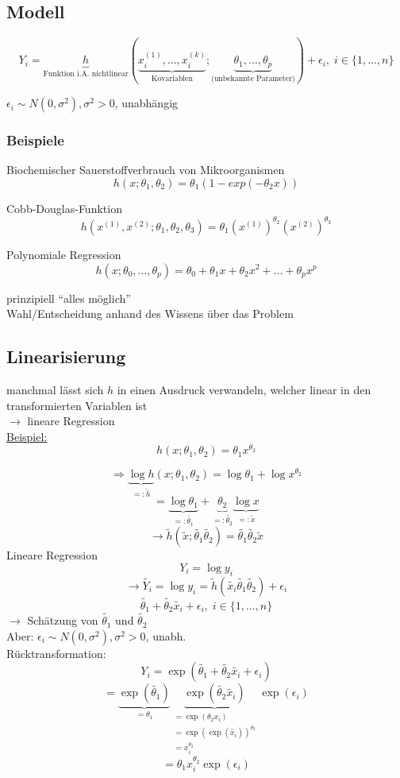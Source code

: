 \documentclass[10pt]{report}
\theoremstyle{definition}
\begin{document}
\subsection{Modell}
\[Y_i = \underbrace{h}_{\text{Funktion i.A. nichtlinear}} \left(\underbrace{x_i^{(1)},...,x_i^{(k)}}_{\text{Kovariablen}};
\underbrace{\theta_1,...,\theta_p}_{\text{(unbekannte Parameter)}} \right) + \epsilon_i, \; i \in \{1,...,n\} \]

$\epsilon_i \sim N(0,\sigma^2) , \sigma^2 >0$, unabhängig

\subsubsection{Beispiele}
Biochemischer Sauerstoffverbrauch von Mikroorganismen
\[h(x;\theta_1,\theta_2) = \theta_1(1-exp(-\theta_2 x)) \]

Cobb-Douglas-Funktion
\[h(x^{(1)},x^{(2)}; \theta_1, \theta_2, \theta_3)= \theta_1(x^{(1)})^{\theta_2} (x^{(2)})^{\theta_3} \]

Polynomiale Regression
\[h(x; \theta_0,..., \theta_p)= \theta_0 + \theta_1 x  + \theta_2 x^2 + ... + \theta_p x^p \]

prinzipiell ``alles möglich'' \\

Wahl/Entscheidung anhand des Wissens über das Problem

\subsection{Linearisierung}
manchmal lässt sich $h$ in einen Ausdruck verwandeln, welcher linear in den transformierten Variablen ist \\
$\rightarrow$ lineare Regression \\
\underline{Beispiel:}
\[ h(x; \theta_1, \theta_2) = \theta_1 x^{\theta_2} \]

\[ \Rightarrow \underbrace{\log h}_{=:  \tilde{h}}(x; \theta_1, \theta_2) = \log \theta_1 + \log x^{\theta_2} \]
\[= \underbrace{\log \theta_1}_{=: \tilde{\theta_1}} + \underbrace{\theta_2}_{=: \tilde{\theta_2}} \underbrace{ \log x }_{=: \tilde{x}} \]
\[ \rightarrow \tilde{h}(\tilde{x};\tilde{\theta_1} \tilde{ \theta_2} ) = \tilde{\theta_1} \tilde{\theta_2} \tilde{x} \]
Lineare Regression
\[ Y_i=\log y_i \]
\[ \rightarrow \tilde{Y_i} = \log y_i = \tilde{h}(\tilde{x_i} \tilde{\theta_1} \tilde{ \theta_2}) + \epsilon_i \]
\[ \tilde{\theta_1} + \tilde{\theta_2} \tilde{x_i} + \epsilon_i, \; i \in \{1,...,n\} \]
$\rightarrow$ Schätzung von $\tilde{\theta_1}$ und $\tilde{\theta_2}$ \\
Aber: $\epsilon_i \sim N(0,\sigma^2), \sigma^2 > 0$, unabh.\\
Rücktransformation:
\[ Y_i = \exp(\tilde{\theta_1} + \tilde{\theta_2} \tilde{x_i} + \epsilon_i ) \]
\[ = \underbrace{\exp(\tilde{\theta_1})}_{=\theta_1} \underbrace{\exp(\tilde{\theta_2}\tilde{x_i})}_{
\substack{= \exp(\theta_2 x_i) \\ = \exp ( \exp ( \tilde{x_i} ))^{\theta_2} \\ = x_i^{\theta_2} }}
\exp(\epsilon_i) \]
\[= \theta_1 x_i^{\theta_2} \exp (\epsilon_i) \]
\end{document}
